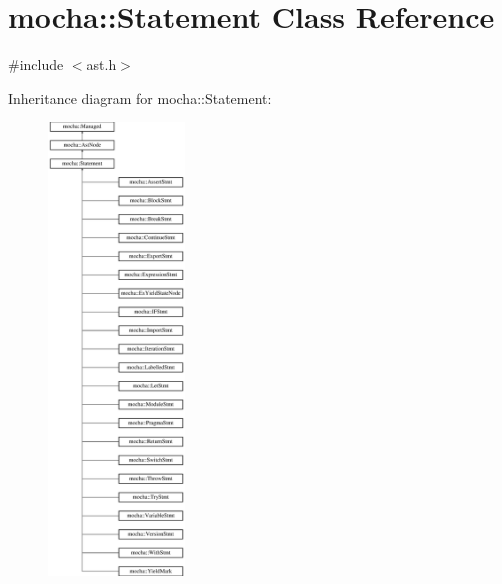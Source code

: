 \hypertarget{classmocha_1_1_statement}{
\section{mocha::Statement Class Reference}
\label{classmocha_1_1_statement}
}


{\ttfamily \#include $<$ast.h$>$}

Inheritance diagram for mocha::Statement:\begin{figure}[H]
\begin{center}
\leavevmode
\includegraphics[height=12.000000cm]{classmocha_1_1_statement}
\end{center}
\end{figure}
